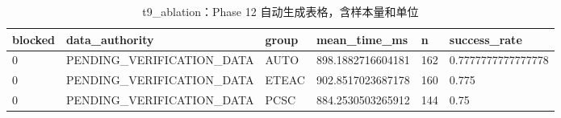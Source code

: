\begin{table}[htbp]
\centering
\caption{t9_ablation：Phase 12 自动生成表格，含样本量和单位}
\begin{tabular}{llllll}
\hline
blocked & data_authority & group & mean_time_ms & n & success_rate \\
\hline
0 & PENDING\_VERIFICATION\_DATA & AUTO & 898.1882716604181 & 162 & 0.7777777777777778 \\
0 & PENDING\_VERIFICATION\_DATA & ETEAC & 902.8517023687178 & 160 & 0.775 \\
0 & PENDING\_VERIFICATION\_DATA & PCSC & 884.2530503265912 & 144 & 0.75 \\
\hline
\end{tabular}
\end{table}
